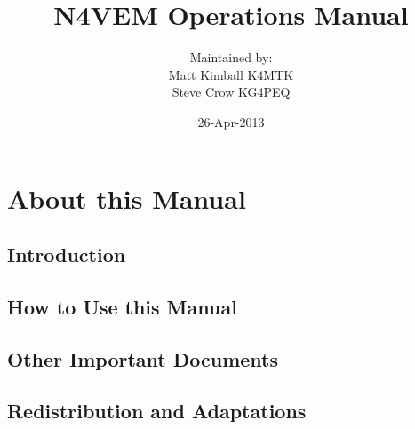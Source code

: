 \documentclass[pdflatex,letterpaper,twoside,12pt]{book}
\title             {N4VEM Operations Manual}
\author            {Maintained by:\\Matt Kimball K4MTK\\Steve Crow KG4PEQ}
\date              {26-Apr-2013}
\begin{document}
\arcaTitlePage
\skipToTOC
\arcaTOC


\chapter{About this Manual}

\section{Introduction}


\section{How to Use this Manual}


\section{Other Important Documents}


\section{Redistribution and Adaptations}

\end{document}
